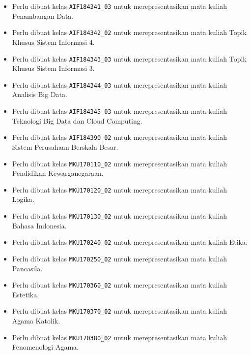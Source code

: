 \documentclass[a4paper,twoside]{article}
\begin{document}
\begin{enumerate}
\begin{enumerate}
\begin{enumerate}
\begin{itemize}
					\item Perlu dibuat kelas \texttt{AIF184341\_03} untuk merepresentasikan mata kuliah Penambangan Data.
					\item Perlu dibuat kelas \texttt{AIF184342\_02} untuk merepresentasikan mata kuliah Topik Khusus Sistem Informasi 4.
					\item Perlu dibuat kelas \texttt{AIF184343\_03} untuk merepresentasikan mata kuliah Topik Khusus Sistem Informasi 3.
					\item Perlu dibuat kelas \texttt{AIF184344\_03} untuk merepresentasikan mata kuliah Analisis Big Data.
					\item Perlu dibuat kelas \texttt{AIF184345\_03} untuk merepresentasikan mata kuliah Teknologi Big Data dan Cloud Computing.
					\item Perlu dibuat kelas \texttt{AIF184390\_02} untuk merepresentasikan mata kuliah Sistem Perusahaan Berskala Besar.
					\item Perlu dibuat kelas \texttt{MKU170110\_02} untuk merepresentasikan mata kuliah Pendidikan Kewarganegaraan.
					\item Perlu dibuat kelas \texttt{MKU170120\_02} untuk merepresentasikan mata kuliah Logika.
					\item Perlu dibuat kelas \texttt{MKU170130\_02} untuk merepresentasikan mata kuliah Bahasa Indonesia.
					\item Perlu dibuat kelas \texttt{MKU170240\_02} untuk merepresentasikan mata kuliah Etika.
					\item Perlu dibuat kelas \texttt{MKU170250\_02} untuk merepresentasikan mata kuliah Pancasila.
					\item Perlu dibuat kelas \texttt{MKU170360\_02} untuk merepresentasikan mata kuliah Estetika.
					\item Perlu dibuat kelas \texttt{MKU170370\_02} untuk merepresentasikan mata kuliah Agama Katolik.
					\item Perlu dibuat kelas \texttt{MKU170380\_02} untuk merepresentasikan mata kuliah Fenomenologi Agama.
				\end{itemize}
	

\end{enumerate}
\end{enumerate}
\end{enumerate}
\end{document}
